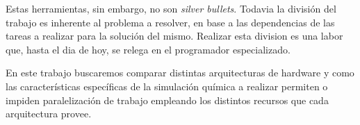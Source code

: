 Estas herramientas, sin embargo, no son \textit{silver bullets}. Todavia la divisi\'on
del trabajo es inherente al problema a resolver, en base a las dependencias de las tareas
a realizar para la soluci\'on del mismo. Realizar esta division es una labor que, hasta
el dia de hoy, se relega en el programador especializado.

En este trabajo buscaremos comparar distintas arquitecturas de hardware y como
las caracter\'isticas espec\'ificas de la simulaci\'on qu\'imica a realizar permiten
o impiden paralelizaci\'on de trabajo empleando los distintos recursos que cada
arquitectura provee.
